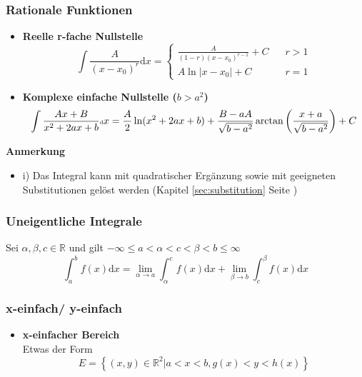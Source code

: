\documentclass[8pt, a4paper, landscape, fleqn]{scrartcl}
\newenvironment {annotation}[1]
				{\begin{itshape} \begin{small} \textbf{#1} \begin{itemize}}
				{\end{itemize} \end{small} \end{itshape}}
\begin{document}
\begin{multicols*}{3}
				\subsubsection{Rationale Funktionen}
					\label{sec:rational_function}
					\begin{itemize}
						\item \textbf{Reelle r-fache Nullstelle}
						\begin{equation*}
							\int \frac{A}{(x-x_0)^r}\text{d}x=
							\begin{cases}
							\frac{A}{(1-r)(x-x_0)^{r-1}}+C \hspace{10pt} &r>1\\
							A\ln \vert x-x_0 \vert +C &r=1
							\end{cases}
						\end{equation*}
						\item \textbf{Komplexe einfache Nullstelle ($b > a^2$)}
						\begin{equation*}
							\begin{tiny}
								\int \frac{Ax+B}{x^2+2ax+b} \text{d}x=\frac{A}{2} \ln(x^2+2ax+b) +\frac{B-aA}{\sqrt{b-a^2}}\arctan \left(\frac{x+a}{\sqrt{b-a^2}}\right) +C
							\end{tiny}			
						\end{equation*}
					\end{itemize}
					\begin{annotation}{Anmerkung}
						\item [i)] Das Integral kann mit quadratischer Ergänzung sowie mit geeigneten Substitutionen gelöst werden (Kapitel \ref{sec:substitution} Seite \pageref{sec:substitution})
					\end{annotation}
				\subsubsection{Uneigentliche Integrale}
					Sei $\alpha, \beta, c \in \mathbb{R}$ und gilt $-\infty\le a<\alpha<c<\beta<b \le \infty$
					\begin{equation*}
						\int_{a}^{b}f(x)\text{d}x=\lim_{\alpha \rightarrow a} \int_{\alpha}^{c}f(x)\text{d}x+\lim_{\beta \rightarrow b} \int_{c}^{\beta}f(x)\text{d}x
					\end{equation*}
				\subsubsection{x-einfach/ y-einfach}
				    \begin{itemize}
						\item \textbf{x-einfacher Bereich}
						\vspace{6pt}\\
						\vspace{-6pt}
						Etwas der Form
					    \[E=\left\{(x, y)\in \mathbb{R}^2 \left \vert    a < x < b, g(x) < y < h(x) \right. \right\}\]
					    

\end{itemize}
\end{multicols*}
\end{document}
